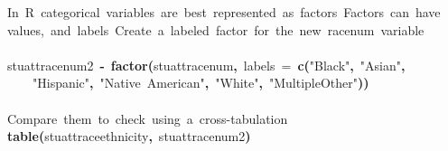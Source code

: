 \documentclass[12pt]{article}
\makeatletter
\newcommand{\hlfunctioncall}[1]{\textcolor[rgb]{0.501960784313725,0,0.329411764705882}{\textbf{#1}}}%
\newcommand{\hlstring}[1]{\textcolor[rgb]{0.6,0.6,1}{#1}}%
\newcommand{\hlkeyword}[1]{\textcolor[rgb]{0,0,0}{\textbf{#1}}}%
\newcommand{\hlargument}[1]{\textcolor[rgb]{0.690196078431373,0.250980392156863,0.0196078431372549}{#1}}%
\newcommand{\hlcomment}[1]{\textcolor[rgb]{0.180392156862745,0.6,0.341176470588235}{#1}}%
\newcommand{\hlassignement}[1]{\textcolor[rgb]{0,0,0}{\textbf{#1}}}%
\newcommand{\hlsymbol}[1]{\textcolor[rgb]{0,0,0}{#1}}%
\newcommand{\hlstd}[1]{\textcolor[rgb]{0,0,0}{#1}}%
\newenvironment{kframe}{%
 \def\FrameCommand##1{\hskip\@totalleftmargin \hskip-\fboxsep
 \colorbox{shadecolor}{##1}\hskip-\fboxsep
     \hskip-\linewidth \hskip-\@totalleftmargin \hskip\columnwidth}%
 \MakeFramed {\advance\hsize-\width
   \@totalleftmargin\z@ \linewidth\hsize
   \@setminipage}}%
 {\par\unskip\endMakeFramed}
\newenvironment{knitrout}{}{} %
\renewenvironment{knitrout}{\begin{footnotesize}}{\end{footnotesize}}
\makeatother
\begin{document}
\begin{knitrout}
\color{fgcolor}\begin{kframe}
\begin{flushleft}
\ttfamily\noindent
\hlcomment{\usebox{\hlnormalsizeboxhash}{\ }In{\ }R{\ }categorical{\ }variables{\ }are{\ }best{\ }represented{\ }as{\ }factors{\ }Factors{\ }can{\ }have}\hspace*{\fill}\\
\hlstd{}\hlcomment{\usebox{\hlnormalsizeboxhash}{\ }values,{\ }and{\ }labels{\ }Create{\ }a{\ }labeled{\ }factor{\ }for{\ }the{\ }new{\ }race\usebox{\hlnormalsizeboxunderscore}num{\ }variable}\hspace*{\fill}\\
\hlstd{}\hspace*{\fill}\\
\hlstd{}\hlsymbol{stuatt}\hlkeyword{\usebox{\hlnormalsizeboxdollar}}\hlsymbol{race\usebox{\hlnormalsizeboxunderscore}num2}{\ }\hlassignement{\usebox{\hlnormalsizeboxlessthan}-}{\ }\hlfunctioncall{factor}\hlkeyword{(}\hlsymbol{stuatt}\hlkeyword{\usebox{\hlnormalsizeboxdollar}}\hlsymbol{race\usebox{\hlnormalsizeboxunderscore}num}\hlkeyword{,}{\ }\hlargument{labels}{\ }\hlargument{=}{\ }\hlfunctioncall{c}\hlkeyword{(}\hlstring{"{}Black"{}}\hlkeyword{,}{\ }\hlstring{"{}Asian"{}}\hlkeyword{,}\hspace*{\fill}\\
\hlstd{}{\ }{\ }{\ }{\ }\hlstring{"{}Hispanic"{}}\hlkeyword{,}{\ }\hlstring{"{}Native{\ }American"{}}\hlkeyword{,}{\ }\hlstring{"{}White"{}}\hlkeyword{,}{\ }\hlstring{"{}MultipleOther"{}}\hlkeyword{)}\hlkeyword{)}\hspace*{\fill}\\
\hlstd{}\hspace*{\fill}\\
\hlstd{}\hlcomment{\usebox{\hlnormalsizeboxhash}{\ }Compare{\ }them{\ }to{\ }check{\ }using{\ }a{\ }cross-tabulation}\hspace*{\fill}\\
\hlstd{}\hlfunctioncall{table}\hlkeyword{(}\hlsymbol{stuatt}\hlkeyword{\usebox{\hlnormalsizeboxdollar}}\hlsymbol{race\usebox{\hlnormalsizeboxunderscore}ethnicity}\hlkeyword{,}{\ }\hlsymbol{stuatt}\hlkeyword{\usebox{\hlnormalsizeboxdollar}}\hlsymbol{race\usebox{\hlnormalsizeboxunderscore}num2}\hlkeyword{)}\mbox{}
\normalfont
\end{flushleft}
\begin{verbatim}
     

\end{verbatim}
\end{kframe}
\end{knitrout}
\end{document}
